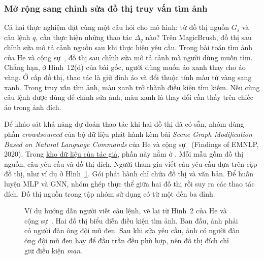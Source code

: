 \subsubsection{Mở rộng sang chỉnh sửa đồ thị truy vấn tìm ảnh}
Cả hai thực nghiệm đặt cùng một câu hỏi cho mô hình: từ đồ thị nguồn
$G_s$ và câu lệnh $q$, cần thực hiện những thao tác $\Delta_q$ nào?
Trên MagicBrush, đồ thị sau chỉnh sửa mô tả cảnh nguồn sau khi thực hiện
yêu cầu. Trong bài toán tìm ảnh của He và cộng sự~\cite{he2020sgmod},
đồ thị sau chỉnh sửa mô tả cảnh mà người dùng muốn tìm. Chẳng hạn, ở
Hình~12(d) của bài gốc, người dùng muốn áo xanh thay cho áo vàng.
Ở cấp đồ thị, thao tác là giữ đỉnh áo và đổi thuộc tính màu từ vàng sang
xanh. Trong truy vấn tìm ảnh, màu xanh trở thành điều kiện tìm kiếm.
Nếu cùng câu lệnh được dùng để chỉnh sửa ảnh, màu xanh là thay đổi cần
thấy trên chiếc áo trong ảnh đích.

Để khảo sát khả năng dự đoán thao tác khi hai đồ thị đã có sẵn, nhóm dùng phần \textit{crowdsourced} của bộ dữ liệu phát hành kèm bài
\textit{Scene Graph Modification Based on Natural Language Commands} của
He và cộng sự~\cite{he2020sgmod} (Findings of EMNLP, 2020).
Trong \href{https://github.com/xlhex/SceneGraphModification}{kho dữ liệu của tác giả},
phần này nằm ở . Mỗi mẫu gồm đồ thị nguồn,
câu yêu cầu và đồ thị đích. Người tham gia viết câu yêu cầu dựa trên cặp
đồ thị, như ví dụ ở Hình~\ref{fig:he-crowd-example}. Gói phát hành chỉ
chứa đồ thị và văn bản. Để huấn luyện MLP và GNN, nhóm ghép thực thể giữa
hai đồ thị rồi suy ra các thao tác đích. Đồ thị nguồn trong tập nhóm sử dụng
có từ một đến ba đỉnh.

\begin{figure}[!htbp]\centering
{}
\caption{Ví dụ hướng dẫn người viết câu lệnh, vẽ lại từ Hình~2 của
He và cộng sự~\cite{he2020sgmod}. Hai đồ thị biểu diễn điều kiện tìm ảnh.
Ban đầu, ảnh phải có người đàn ông đội mũ đen. Sau khi sửa yêu cầu,
ảnh có người đàn ông đội mũ đen hay để đầu trần đều phù hợp, nên
đồ thị đích chỉ giữ điều kiện \textit{man}.}
\label{fig:he-crowd-example}
\end{figure}


